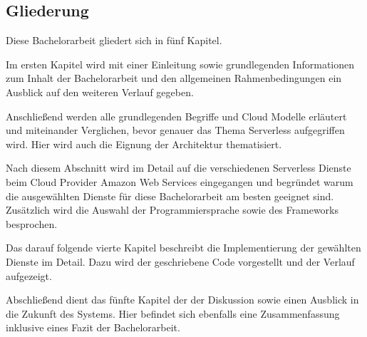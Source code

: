 \subsection{Gliederung}

Diese Bachelorarbeit gliedert sich in fünf Kapitel.

Im ersten Kapitel wird mit einer Einleitung sowie grundlegenden Informationen zum Inhalt der Bachelorarbeit und
den allgemeinen Rahmenbedingungen ein Ausblick auf den weiteren Verlauf gegeben.

Anschließend werden alle grundlegenden Begriffe und Cloud Modelle erläutert und miteinander Verglichen, bevor genauer das Thema Serverless aufgegriffen wird.
Hier wird auch die Eignung der Architektur thematisiert.

Nach diesem Abschnitt wird im Detail auf die verschiedenen Serverless Dienste beim Cloud Provider Amazon Web Services eingegangen und begründet warum
die ausgewählten Dienste für diese Bachelorarbeit am besten geeignet sind. Zusätzlich wird die Auswahl der Programmiersprache sowie des Frameworks besprochen.

Das darauf folgende vierte Kapitel beschreibt die Implementierung der gewählten Dienste im Detail. Dazu wird der geschriebene Code vorgestellt und
der Verlauf aufgezeigt.

Abschließend dient das fünfte Kapitel der der Diskussion sowie einen Ausblick in die Zukunft des Systems.
Hier befindet sich ebenfalls eine Zusammenfassung inklusive eines Fazit der Bachelorarbeit.



